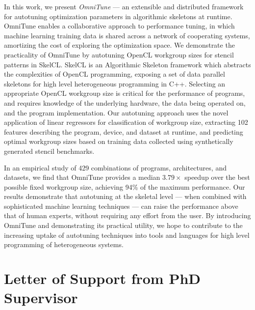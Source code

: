In this work, we present \textit{OmniTune} --- an extensible and
distributed framework for autotuning optimization parameters in
algorithmic skeletons at runtime. OmniTune enables a collaborative
approach to performance tuning, in which machine learning training
data is shared across a network of cooperating systems, amortizing the
cost of exploring the optimization space. We demonstrate the
practicality of OmniTune by autotuning OpenCL workgroup sizes for
stencil patterns in SkelCL. SkelCL is an Algorithmic Skeleton
framework which abstracts the complexities of OpenCL programming,
exposing a set of data parallel skeletons for high level heterogeneous
programming in C++. Selecting an appropriate OpenCL workgroup size is
critical for the performance of programs, and requires knowledge of
the underlying hardware, the data being operated on, and the program
implementation. Our autotuning approach uses the novel application of
linear regressors for classification of workgroup size, extracting 102
features describing the program, device, and dataset at runtime, and
predicting optimal workgroup sizes based on training data collected
using synthetically generated stencil benchmarks.

In an empirical study of 429 combinations of programs, architectures,
and datasets, we find that OmniTune provides a median $3.79\times$
speedup over the best possible fixed workgroup size, achieving 94\% of
the maximum performance. Our results demonstrate that autotuning at
the skeletal level --- when combined with sophisticated machine
learning techniques --- can raise the performance above that of human
experts, without requiring any effort from the user. By introducing
OmniTune and demonstrating its practical utility, we hope to
contribute to the increasing uptake of autotuning techniques into
tools and languages for high level programming of heterogeneous
systems.

\newpage



\newpage

\section*{Letter of Support from PhD Supervisor}



